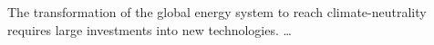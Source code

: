 The transformation of the global energy system to reach climate-neutrality requires large investments into new technologies. \dots